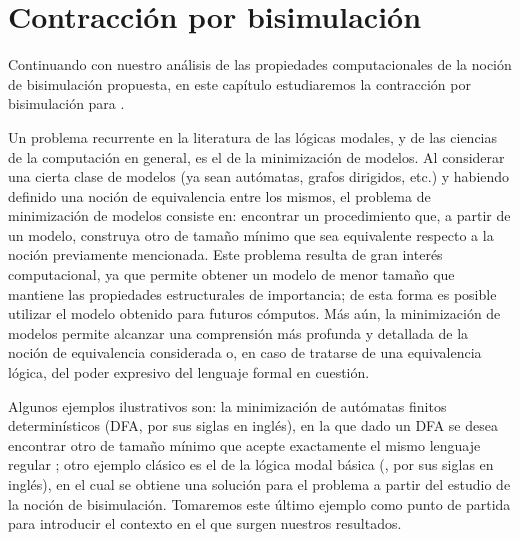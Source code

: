 \chapter{Contracción por bisimulación}



Continuando con nuestro análisis de las propiedades computacionales de la noción de bisimulación propuesta, en este 
capítulo estudiaremos la contracción por bisimulación para \KHilogic.

Un problema recurrente en la literatura de las lógicas modales, y de las ciencias de la computación en general, es el de la minimización de modelos. 
Al considerar una cierta clase de modelos (ya sean autómatas, grafos dirigidos, etc.) y habiendo definido una noción de equivalencia 
entre los mismos, el problema de minimización de modelos consiste en: encontrar un procedimiento que, a partir de un modelo, construya 
otro de tamaño mínimo %
que sea equivalente respecto a la noción previamente mencionada. Este problema resulta de gran interés computacional, ya que permite 
obtener un modelo de menor tamaño que mantiene las propiedades estructurales de importancia; de esta forma es posible utilizar 
el modelo obtenido para futuros cómputos. Más aún, la minimización de modelos permite alcanzar una comprensión más profunda y detallada
de la noción de equivalencia considerada o, en caso de tratarse de una equivalencia lógica, del poder expresivo del 
lenguaje formal en cuestión.

Algunos ejemplos ilustrativos son: 
la minimización de autómatas finitos determinísticos (DFA, por sus siglas en inglés), en la que dado 
un DFA se desea encontrar otro de tamaño mínimo que acepte exactamente el mismo lenguaje regular \cite{automataTheoryHopcroft}; 
otro ejemplo clásico es el de la lógica modal básica (\bml, por sus siglas en inglés), en el cual se obtiene una solución para el 
problema a partir del estudio de la noción de bisimulación. Tomaremos este último ejemplo como punto de partida para introducir el 
contexto en el que surgen nuestros resultados.

